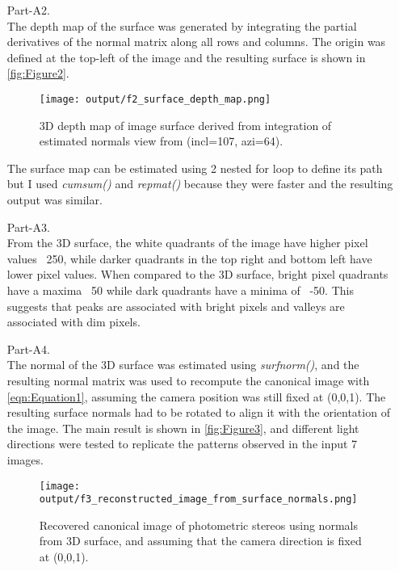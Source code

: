 \documentclass[12pt]{report}
\begin{document}
\begin{enumerate}
    \item[Part-A2.]
    \ \\
    The depth map of the surface was generated by integrating the partial derivatives of the normal matrix along all rows and columns. The origin was defined 
    at the top-left of the image and the resulting surface is shown in \autoref{fig:Figure2}.

    \begin{figure}[H]
        \centering
        \texttt{[image: output/f2\_surface\_depth\_map.png]}
        \caption{3D depth map of image surface derived from integration of estimated normals view from (incl=107, azi=64).}
        \label{fig:Figure2}
    \end{figure}

    \FloatBarrier 

    The surface map can be estimated using 2 nested for loop to define its path but I used \emph{cumsum()} and \emph{repmat()} because they were faster and the 
    resulting output was similar.

    \item[Part-A3.]
    \ \\
    From the 3D surface, the white quadrants of the image have higher pixel values ~250, while darker quadrants in the top right and bottom left have lower pixel 
    values. When compared to the 3D surface, bright pixel quadrants have a maxima ~50 while dark quadrants have a minima of ~-50. This suggests that peaks are 
    associated with bright pixels and valleys are associated with dim pixels.

    \item[Part-A4.]
    \ \\
    The normal of the 3D surface was estimated using \emph{surfnorm()}, and the resulting normal matrix was used to recompute the canonical image with 
    \autoref{eqn:Equation1}, assuming the camera position was still fixed at (0,0,1). The resulting surface normals had to be rotated to align it with the orientation 
    of the image. The main result is shown in \autoref{fig:Figure3}, and different light directions were tested to replicate the patterns observed in the input 7 images.

    \begin{figure}[H]
        \centering
        \texttt{[image: output/f3\_reconstructed\_image\_from\_surface\_normals.png]}
        \caption{Recovered canonical image of photometric stereos using normals from 3D surface, and assuming that the camera direction is fixed at (0,0,1).}
        \label{fig:Figure3}
    \end{figure}


\end{enumerate}
\end{document}
